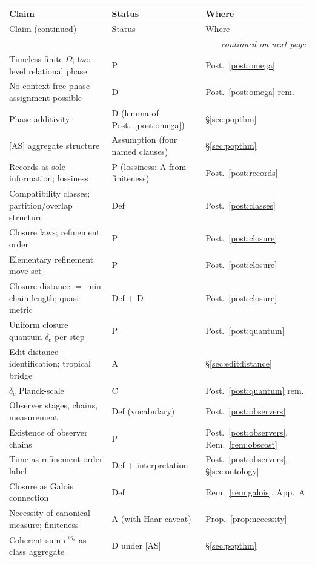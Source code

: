 \documentclass[11pt]{article}
\theoremstyle{definition}
\theoremstyle{remark}
\begin{document}
{\small
\begin{longtable}{@{}lll@{}}
\toprule
Claim & Status & Where\\
\midrule
\endfirsthead
\toprule
Claim (continued) & Status & Where\\
\midrule
\endhead
\bottomrule
\multicolumn{3}{r}{\footnotesize\emph{continued on next page}}\\
\endfoot
\bottomrule
\endlastfoot
Timeless finite $\Omega$; two-level relational phase & P & Post.~\ref{post:omega}\\
No context-free phase assignment possible & D \cite{TillittBorn} & Post.~\ref{post:omega} rem.\\
Phase additivity & D (lemma of Post.~\ref{post:omega}) & \S\ref{sec:popthm}\\
{[AS]} aggregate structure & Assumption (four named clauses) & \S\ref{sec:popthm}\\
Records as sole information; lossiness & P (lossiness: A from finiteness) & Post.~\ref{post:records}\\
Compatibility classes; partition/overlap structure & Def & Post.~\ref{post:classes}\\
Closure laws; refinement order & P & Post.~\ref{post:closure}\\
Elementary refinement move set & P & Post.~\ref{post:closure}\\
Closure distance $=$ min chain length; quasi-metric & Def $+$ D & Post.~\ref{post:closure}\\
Uniform closure quantum $\delta_c$ per step & P & Post.~\ref{post:quantum}\\
Edit-distance identification; tropical bridge & A & \S\ref{sec:editdistance}\\
$\delta_c$ Planck-scale & C & Post.~\ref{post:quantum} rem.\\
Observer stages, chains, measurement & Def (vocabulary) & Post.~\ref{post:observers}\\
Existence of observer chains & P & Post.~\ref{post:observers}, Rem.~\ref{rem:obscost}\\
Time as refinement-order label & Def $+$ interpretation & Post.~\ref{post:observers}, \S\ref{sec:ontology}\\
Closure as Galois connection & Def & Rem.~\ref{rem:galois}, App.~A\\
Necessity of canonical measure; finiteness & A (with Haar caveat) & Prop.~\ref{prop:necessity}\\
Coherent sum $e^{iS_r}$ as class aggregate & D under [AS] \cite{TillittBorn} & \S\ref{sec:popthm}\\

\end{longtable}}
\end{document}
